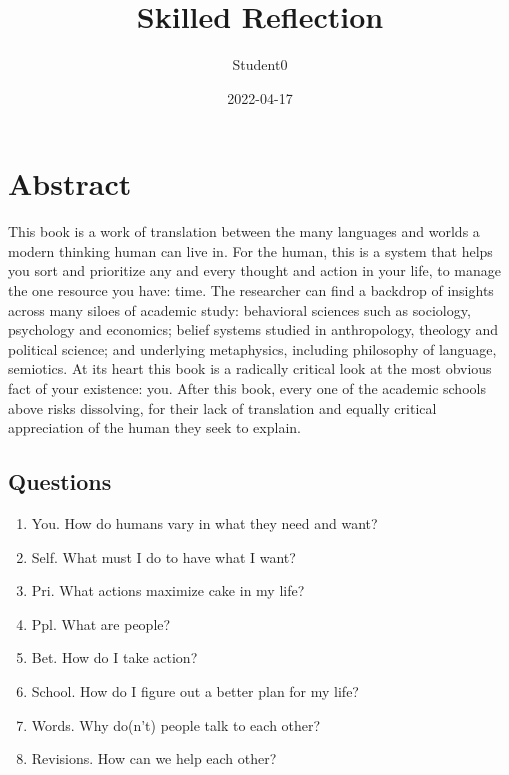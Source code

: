 \documentclass[
]{book}
\title{Skilled Reflection}
\author{Student0}
\date{2022-04-17}
\providecommand{\tightlist}{%
  \setlength{\itemsep}{0pt}\setlength{\parskip}{0pt}}
\begin{document}
\maketitle

{
\setcounter{tocdepth}{1}
\tableofcontents
}
\hypertarget{abstract}{%
\chapter*{Abstract}\label{abstract}}

This book is a work of translation between the many languages and worlds a modern thinking human can live in. For the human, this is a system that helps you sort and prioritize any and every thought and action in your life, to manage the one resource you have: time. The researcher can find a backdrop of insights across many siloes of academic study: behavioral sciences such as sociology, psychology and economics; belief systems studied in anthropology, theology and political science; and underlying metaphysics, including philosophy of language, semiotics. At its heart this book is a radically critical look at the most obvious fact of your existence: you. After this book, every one of the academic schools above risks dissolving, for their lack of translation and equally critical appreciation of the human they seek to explain.

\hypertarget{questions}{%
\section{Questions}\label{questions}}

\begin{enumerate}
\def\labelenumi{\arabic{enumi}.}
\tightlist
\item
  You. How do humans vary in what they need and want?
\item
  Self. What must I do to have what I want?
\item
  Pri. What actions maximize cake in my life?\\
\item
  Ppl. What are people?\\
\item
  Bet. How do I take action?\\
\item
  School. How do I figure out a better plan for my life?\\
\item
  Words. Why do(n't) people talk to each other?\\
\item
  Revisions. How can we help each other?
\end{enumerate}
\end{document}
